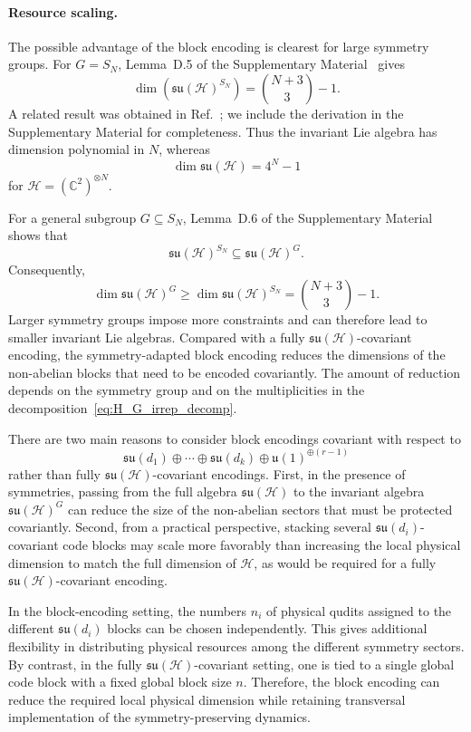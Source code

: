 \documentclass[10pt,twocolumn,superscriptaddress,aps,amsmath,amssymb,citeautoscript,floatfix,prx,longbibliography]{revtex4-2}
\newcounter{alg}
\theoremstyle{plain}
\theoremstyle{plain}
\theoremstyle{plain}
\theoremstyle{plain}
\theoremstyle{plain}
\theoremstyle{plain}
\begin{document}
\paragraph{Resource scaling.}

The possible advantage of the block encoding is clearest for large symmetry groups. For $G=S_N$, Lemma~D.5 of the Supplementary Material~\cite{SuppMat} gives
$$
\dim\left(\mathfrak{su}(\mathcal H)^{S_N}\right)
=
\binom{N+3}{3}
-
1 .
$$
A related result was obtained in Ref.~\cite{Albertini2018}; we include the derivation in the Supplementary Material for completeness. Thus the invariant Lie algebra has dimension polynomial in $N$, whereas
$$
\dim\mathfrak{su}(\mathcal H)
=
4^N-1
$$
for $\mathcal H=(\mathbb C^2)^{\otimes N}$.

For a general subgroup $G\subseteq S_N$, Lemma~D.6 of the Supplementary Material~\cite{SuppMat} shows that
$$
\mathfrak{su}(\mathcal H)^{S_N}
\subseteq
\mathfrak{su}(\mathcal H)^G .
$$
Consequently,
\begin{equation}\label{eq:inv_alg_dim}
\dim\mathfrak{su}(\mathcal H)^G
\ge
\dim\mathfrak{su}(\mathcal H)^{S_N}
=
\binom{N+3}{3}
-
1 .
\end{equation}
Larger symmetry groups impose more constraints and can therefore lead to smaller invariant Lie algebras. Compared with a fully $\mathfrak{su}(\mathcal H)$-covariant encoding, the symmetry-adapted block encoding reduces the dimensions of the non-abelian blocks that need to be encoded covariantly. The amount of reduction depends on the symmetry group and on the multiplicities in the decomposition~\eqref{eq:H_G_irrep_decomp}.

There are two main reasons to consider block encodings covariant with respect to
$$
\mathfrak{su}(d_1)
\oplus
\cdots
\oplus
\mathfrak{su}(d_k)
\oplus
\mathfrak{u}(1)^{\oplus(r-1)}
$$
rather than fully $\mathfrak{su}(\mathcal H)$-covariant encodings. First, in the presence of symmetries, passing from the full algebra $\mathfrak{su}(\mathcal H)$ to the invariant algebra $\mathfrak{su}(\mathcal H)^G$ can reduce the size of the non-abelian sectors that must be protected covariantly. Second, from a practical perspective, stacking several $\mathfrak{su}(d_i)$-covariant code blocks may scale more favorably than increasing the local physical dimension to match the full dimension of $\mathcal H$, as would be required for a fully $\mathfrak{su}(\mathcal H)$-covariant encoding.

In the block-encoding setting, the numbers $n_i$ of physical qudits assigned to the different $\mathfrak{su}(d_i)$ blocks can be chosen independently. This gives additional flexibility in distributing physical resources among the different symmetry sectors. By contrast, in the fully $\mathfrak{su}(\mathcal H)$-covariant setting, one is tied to a single global code block with a fixed global block size $n$. Therefore, the block encoding can reduce the required local physical dimension while retaining transversal implementation of the symmetry-preserving dynamics.
\end{document}
